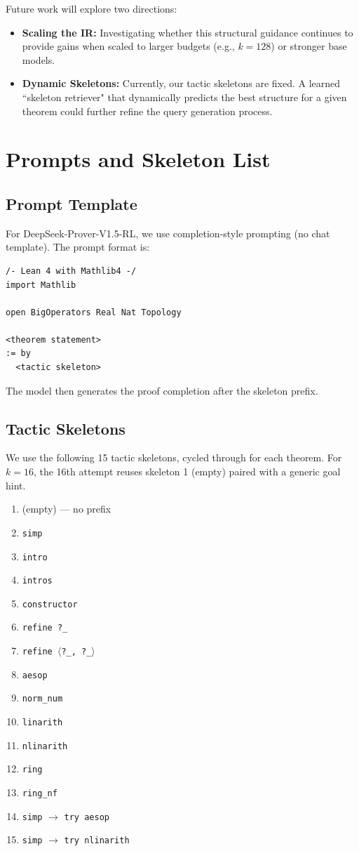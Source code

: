 \documentclass{article}
\begin{document}
Future work will explore two directions:
\begin{itemize}
    \item \textbf{Scaling the IR:} Investigating whether this structural guidance continues to provide gains when scaled to larger budgets (e.g., $k=128$) or stronger base models.
    \item \textbf{Dynamic Skeletons:} Currently, our tactic skeletons are fixed. A learned ``skeleton retriever" that dynamically predicts the best structure for a given theorem could further refine the query generation process.
\end{itemize}

\appendix

\section{Prompts and Skeleton List}
\label{app:prompts}

\subsection{Prompt Template}
For DeepSeek-Prover-V1.5-RL, we use completion-style prompting (no chat template). The prompt format is:

\begin{verbatim}
/- Lean 4 with Mathlib4 -/
import Mathlib

open BigOperators Real Nat Topology

<theorem statement>
:= by
  <tactic skeleton>
\end{verbatim}

The model then generates the proof completion after the skeleton prefix.

\subsection{Tactic Skeletons}
We use the following 15 tactic skeletons, cycled through for each theorem. For $k=16$, the 16th attempt reuses skeleton 1 (empty) paired with a generic goal hint.

\begin{enumerate}
\item (empty) --- no prefix
\item \texttt{simp}
\item \texttt{intro}
\item \texttt{intros}
\item \texttt{constructor}
\item \texttt{refine ?\_}
\item \texttt{refine \ensuremath{\langle}?\_,\,?\_\ensuremath{\rangle}}
\item \texttt{aesop}
\item \texttt{norm\_num}
\item \texttt{linarith}
\item \texttt{nlinarith}
\item \texttt{ring}
\item \texttt{ring\_nf}
\item \texttt{simp} $\to$ \texttt{try aesop}
\item \texttt{simp} $\to$ \texttt{try nlinarith}
\end{enumerate}
\end{document}
